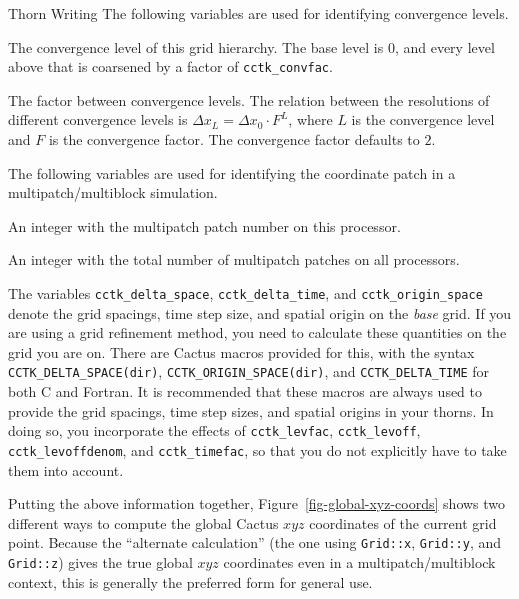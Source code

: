 \begin{cactuspart}{Thorn Writing}
The following variables are used for identifying convergence levels.

\begin{Lentry}
\item [\texttt{cctk\_convlevel}] The convergence level of this grid hierarchy.
        The base level is $0$, and every level above that is
        coarsened by a factor of \texttt{cctk\_convfac}.
\item [\texttt{cctk\_convfac}] The factor between convergence levels.
        The relation between the resolutions of different convergence
        levels is $\Delta x_L = \Delta x_0 \cdot F^L$, where $L$ is the
        convergence level and $F$ is the convergence factor.
        The convergence factor defaults to $2$.
\end{Lentry}

The following variables are used for identifying the coordinate patch in a
multipatch/multiblock simulation.

\begin{Lentry}
\item [\texttt{cctk\_patch}] An integer with the multipatch patch
      number on this processor.
\item [\texttt{cctk\_npatches}] An integer with the total number of
      multipatch patches on all processors.
\end{Lentry}

The variables \texttt{cctk\_delta\_space}, \texttt{cctk\_delta\_time}, and
\texttt{cctk\_origin\_space} denote the grid spacings, time step size,
and spatial origin on the \textit{base} grid.  If you are using a grid
refinement method, you need to calculate these quantities on the grid
you are on.  There are Cactus macros provided for this, with the
syntax \texttt{CCTK\_DELTA\_SPACE(dir)}, \texttt{CCTK\_ORIGIN\_SPACE(dir)},
and \texttt{CCTK\_DELTA\_TIME} for both C and Fortran.  It is recommended
that these macros are always used to provide the grid spacings, time
step sizes, and spatial origins in your thorns.  In doing so, you
incorporate the effects of \texttt{cctk\_levfac}, \texttt{cctk\_levoff},
\texttt{cctk\_levoffdenom}, and \texttt{cctk\_timefac}, so that you do not
explicitly have to take them into account.

Putting the above information together, Figure~\ref{fig-global-xyz-coords}
shows two different ways to compute the global Cactus $xyz$ coordinates
of the current grid point.  Because the ``alternate calculation'' (the
one using \verb|Grid::x|, \verb|Grid::y|, and \verb|Grid::z|) gives the
true global $xyz$ coordinates even in a multipatch/multiblock context,
this is generally the preferred form for general use.


\end{cactuspart}
